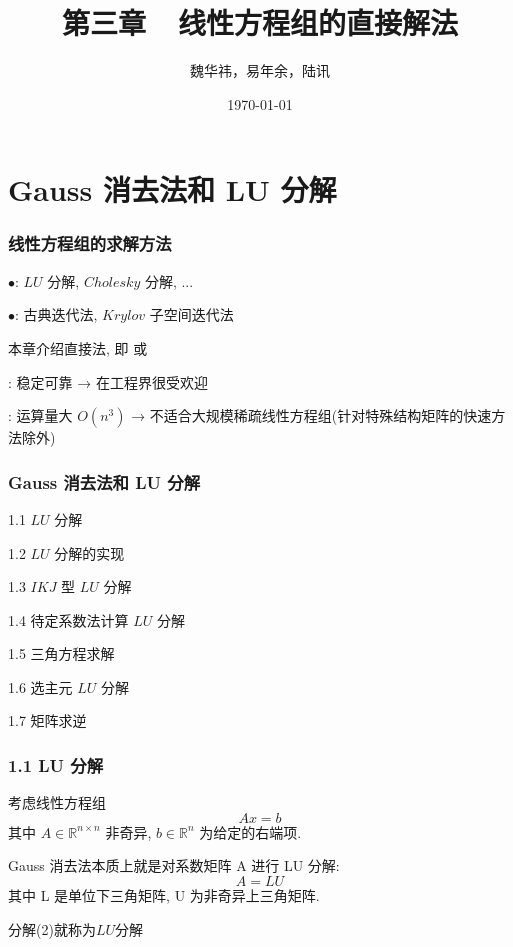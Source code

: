\documentclass[notheorems,serif]{beamer}
\begin{document}
\title[]{第三章~~线性方程组的直接解法}

\author[]{魏华祎，易年余，陆讯}


\date{\today}

\frame[plain]{\titlepage}


\section{Gauss 消去法和 LU 分解}

\begin{frame}
\frametitle{线性方程组的求解方法}

$\bullet${}: $LU$ 分解, $Cholesky$ 分解, ...

$\bullet${}: 古典迭代法, $Krylov$ 子空间迭代法

本章介绍直接法, 即 {} 或 {}

{}: 稳定可靠 → 在工程界很受欢迎

{}: 运算量大 $O(n^3)$ → 不适合大规模稀疏线性方程组(针对特殊结构矩阵的快速方法除外)
\end{frame}

\begin{frame}
\frametitle{Gauss 消去法和 LU 分解}
1.1 \qquad$LU$ 分解

1.2 \qquad$LU$ 分解的实现

1.3 \qquad$IKJ$ 型 $LU$ 分解

1.4 \qquad 待定系数法计算 $LU$ 分解

1.5 \qquad 三角方程求解

1.6 \qquad 选主元 $LU$ 分解

1.7 \qquad 矩阵求逆

\end{frame}

\begin{frame}
\frametitle{1.1 \quad LU 分解}
考虑线性方程组
\begin{equation}
A x=b
\end{equation}
其中 $A ∈ \mathbb{R}^{n \times n}$ 非奇异, $b ∈ \mathbb{R}^n$ 为给定的右端项.

Gauss 消去法本质上就是对系数矩阵 A 进行 LU 分解:
\begin{equation}
A=L U
\end{equation}
其中 L 是单位下三角矩阵, U 为非奇异上三角矩阵.

分解(2)就称为$LU$分解
\end{frame}
\end{document}
